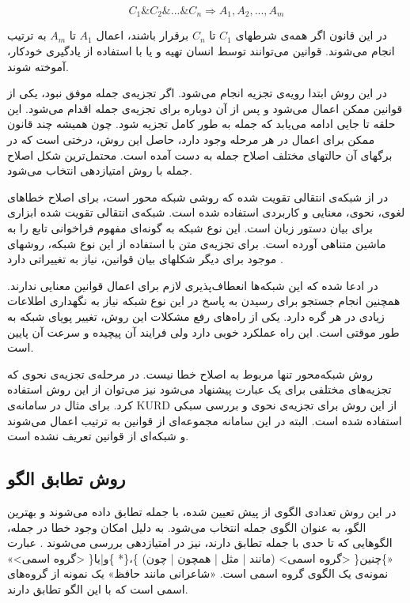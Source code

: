 \documentclass{report}
\begin{document}
\begin{equation}
C_{1}\&C_{2}\&...\&C_{n}\Rightarrow A_{1},A_{2},...,A_{m}
\end{equation}

در این قانون اگر همه‌ی شرطهای $C_{1}$ تا $C_{n}$ برقرار باشند، اعمال $A_{1}$ تا $A_{m}$ به ترتیب انجام می‌شوند. قوانین می‌توانند توسط انسان تهیه و یا با استفاده از یادگیری خودکار، آموخته شوند.

در این روش ابتدا رویه‌ی تجزیه انجام می‌شود. اگر تجزیه‌ی جمله موفق نبود، یکی از قوانین ممکن اعمال می‌شود و پس از آن دوباره برای تجزیه‌ی جمله اقدام می‌شود. این حلقه تا جایی ادامه می‌یابد که جمله به طور کامل تجزیه شود. چون همیشه چند قانون ممکن برای اعمال در هر مرحله وجود دارد، حاصل این روش، درختی است که در برگهای آن حالتهای مختلف اصلاح جمله به دست آمده است. محتمل‌ترین شکل اصلاح جمله با روش امتیازدهی انتخاب می‌شود.

در \cite{ct13} از شبکه‌ی انتقالی تقویت شده که روشی شبکه محور است، برای اصلاح خطاهای لغوی، نحوی، معنایی و کاربردی استفاده شده است. شبکه‌ی انتقالی تقویت شده ابزاری برای بیان دستور زبان است. این نوع شبکه به گونه‌ای مفهوم فراخوانی تابع را به ماشین متناهی آورده است. برای تجزیه‌ی متن با استفاده از این نوع شبکه، روشهای موجود برای دیگر شکلهای بیان قوانین، نیاز به تغییراتی دارد \cite{ct14}.

در \cite{ct1} ادعا شده که این شبکه‌ها انعطاف‌پذیری لازم برای اعمال قوانین معنایی ندارند. همچنین انجام جستجو برای رسیدن به پاسخ در این نوع شبکه نیاز به نگهداری اطلاعات زیادی در هر گره دارد. یکی از راه‌های رفع مشکلات این روش، تغییر پویای شبکه به طور موقتی است. این راه عملکرد خوبی دارد ولی فرایند آن پیچیده و سرعت آن پایین است.

روش شبکه‌محور تنها مربوط به اصلاح خطا نیست. در مرحله‌ی تجزیه‌ی نحوی که تجزیه‌های مختلفی برای یک عبارت پیشنهاد می‌شود نیز می‌توان از این روش استفاده کرد. برای مثال در سامانه‌ی KURD \cite{ct15} از این روش برای تجزیه‌ی نحوی و بررسی سبکی استفاده شده است. البته در این سامانه مجموعه‌ای از قوانین به ترتیب اعمال می‌شوند و شبکه‌ای از قوانین تعریف نشده است.

\subsection{روش تطابق الگو}
در این روش تعدادی الگوی از پیش تعیین شده، با جمله تطابق داده می‌شوند و بهترین الگو، به عنوان الگوی جمله انتخاب می‌شود. به دلیل امکان وجود خطا در جمله، الگوهایی که تا حدی با جمله تطابق دارند، نیز در امتیازدهی بررسی می‌شوند \cite{ct16}. عبارت 
«\}چنین\{ <گروه اسمی> (مانند | مثل | همچون | چون) \}< گروه اسمی>،\{* \}و|یا\{ <گروه اسمی>»
نمونه‌ی یک الگوی گروه اسمی است. «شاعرانی مانند حافظ» یک نمونه از گروه‌های اسمی است که با این الگو تطابق دارند.
\end{document}
